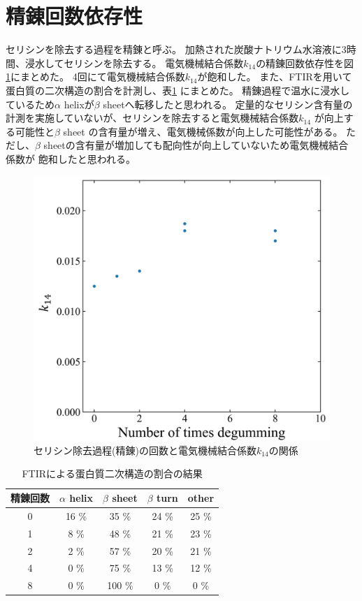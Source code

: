 \documentclass[dvipdfmx,12pt,a4paper]{jreport}
\begin{document}
			\section{精錬回数依存性}
			セリシンを除去する過程を精錬と呼ぶ。
			加熱された炭酸ナトリウム水溶液に3時間、浸水してセリシンを除去する。
			電気機械結合係数$k_{14}$の精錬回数依存性を図\ref{times_k}にまとめた。
			4回にて電気機械結合係数$k_{14}$が飽和した。
			また、FTIRを用いて蛋白質の二次構造の割合を計測し、表\ref{FTIR_蛋白質二次構造_セリシン除去回数}
			にまとめた。
			精錬過程で温水に浸水しているため$\alpha$ helixが$\beta$ sheetへ転移したと思われる。
			定量的なセリシン含有量の計測を実施していないが、セリシンを除去すると電気機械結合係数$k_{14}$
			が向上する可能性と$\beta$ sheet の含有量が増え、電気機械係数が向上した可能性がある。
			ただし、$\beta$ sheetの含有量が増加しても配向性が向上していないため電気機械結合係数が
			飽和したと思われる。
			\begin{figure}[h]
				\centering
				\includegraphics[scale=0.45]{number_k.jpg}
				\caption{セリシン除去過程(精錬)の回数と電気機械結合係数$k_{14}$の関係}
				\label{times_k}
			\end{figure}
			\begin{table}[h]
				\centering
				\caption{FTIRによる蛋白質二次構造の割合の結果}
				\label{FTIR_蛋白質二次構造_セリシン除去回数}
				\begin{tabular}{c c c c c} \hline
					精錬回数 & $\alpha$ helix & $\beta$ sheet &$\beta$ turn & other \\ \hline \hline
					0 & 16 \% & 35 \% &  24 \% & 25 \% \\
					1 & 8 \% & 48 \% &  21 \% & 23 \% \\
					2 &  2 \% & 57 \% & 20 \% & 21 \% \\
					4 & 0 \% & 75 \% & 13 \% & 12 \% \\ 
					8 & 0 \% & 100 \% & 0 \% & 0 \% \\ \hline
				\end{tabular}
			\end{table}
			
\end{document}
